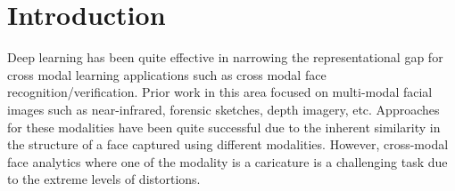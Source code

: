 \section{Introduction}

 Deep learning has been quite effective in narrowing the representational gap for cross modal learning applications such as cross modal face recognition/verification. Prior work in this area focused on multi-modal facial images such as near-infrared, forensic sketches, depth imagery, etc. Approaches for these modalities have been quite successful due to the inherent similarity in the structure of a face captured using different modalities. However, cross-modal face analytics where one of the modality is a caricature is a challenging task due to the extreme levels of distortions. 



